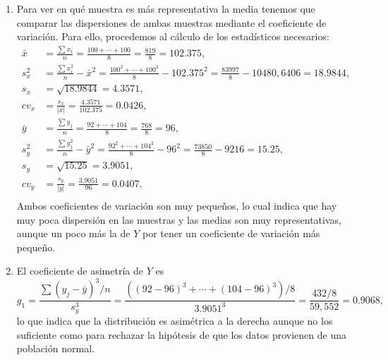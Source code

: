 {\begin{enumerate}
\item Para ver en qué muestra es más representativa la media tenemos que comparar las dispersiones de ambas muestras mediante el coeficiente de variación. Para ello, procedemos al cálculo de los estadísticos necesarios:
\begin{align*}
\bar{x} & = \frac{\sum x_{i}}{n}=\frac{100+\cdots+100}{8}=\frac{819}{8}=102.375,  \\
s_{x}^2 & = \frac{\sum x_{i}^2}{n}-\bar{x}^2 =
\frac{100^2+\cdots+100^2}{8}-102.375^2=\frac{83997}{8}-10480,6406=18.9844,  \\
s_{x} & = \sqrt{18.9844}=4.3571,  \\
cv_x &= \frac{s_x}{|\bar{x}|}= \frac{4.3571}{102.375}=0.0426,\\
\bar{y} & = \frac{\sum y_{j}}{n}=\frac{92+\cdots+104}{8}=
\frac{768}{8}=96,  \\
s_{y}^2 & = \frac{\sum y_{j}^2}{n}-\bar{y}^2 =
\frac{92^2+\cdots+104^2}{8}-96^2=\frac{73850}{8}-9216=15.25,  \\
s_{y} & = \sqrt{15.25}=3.9051,  \\
cv_y &= \frac{s_y}{|\bar{y}|}= \frac{3.9051}{96}=0.0407,\\
\end{align*}
Ambos coeficientes de variación son muy pequeños, lo cual indica que hay muy poca dispersión en las muestras y las medias son muy representativas, aunque un poco más la de $Y$ por tener un coeficiente de variación más pequeño.

\item El coeficiente de asimetría de $Y$ es 
\[g_1=\frac{\sum(y_j-\bar{y})^3/n}{s_y^3}=
\frac{\left((92-96)^3+\cdots +(104-96)^3\right)/8}{3.9051^3}=\frac{432/8}{59,552}=0.9068,\]
lo que indica que la distribución es asimétrica a la derecha aunque no los suficiente como para rechazar la hipótesis de que los datos provienen de una población normal.
\end{enumerate}
}


